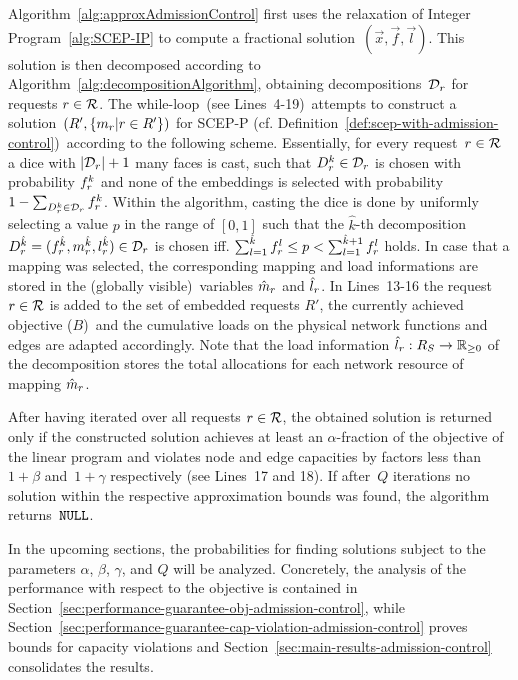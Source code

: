 \documentclass[10pt, conference, letterpaper]{IEEEtran}
\begin{document}
Algorithm~\ref{alg:approxAdmissionControl} first 
uses the relaxation of Integer Program~\ref{alg:SCEP-IP} to compute a 
fractional solution~$(\vec{x}, \vec{f}, \vec{l})$. This solution is then 
decomposed according to Algorithm~\ref{alg:decompositionAlgorithm}, obtaining decompositions~$\PotEmbeddings$ for requests $r \in \mathcal{R}$. 
The while-loop~(see Lines~4-19)~attempts to construct 
a solution~$(R', \{m_r | r \in R'\})$ for SCEP-P (cf. Definition~\ref{def:scep-with-admission-control})~according to the following scheme.
Essentially, for every request~$r \in \mathcal{R}$ a dice with $|\PotEmbeddings|+1$ many faces is cast, such that $D^k_{\req} \in \PotEmbeddings$ is chosen with probability $\prob$ and none of the embeddings is selected with probability $1-\sum_{D^k_{\req} \in \PotEmbeddings} \prob$. Within the algorithm, casting the dice is done by uniformly selecting a value $p$
 in the range of $[0,1]$ such that the $\hat{k}$-th
decomposition~$D^{\hat{k}}_{\req} = (\prob[\req][\hat{k}], \mapping[\req][{\hat{k}}],  \load[\req][{\hat{k}}]) \in  \PotEmbeddings$ is chosen iff. $\sum^{\hat{k}}_{l=1} \prob[\req][l] \leq p < \sum^{{\hat{k}}+1}_{l=1} \prob[\req][l] $ holds. In case that a mapping was selected, the corresponding mapping and load informations are stored in the (globally visible)~variables $\hat{m}_{r}$ and $\hat{l}_{r}$. In Lines~13-16 the request $r \in \mathcal{R}$ is added to the set of embedded requests $R'$, the currently achieved objective ($B$)~and the cumulative loads on the physical network functions and edges are adapted accordingly. Note that the load information $\hat{l}_{r}: R_{S} \to \mathbb{R}_{\geq 0}$ of the decomposition stores the total allocations for each network resource of mapping $\hat{m}_{r}$.


After having iterated over all requests $r \in \mathcal{R}$, the obtained solution is returned only if 
the constructed solution achieves at least an $\alpha$-fraction of the objective of the linear program and 
violates node and edge capacities by factors less than~$1+\beta$ and~$1+\gamma$ respectively 
(see Lines~17 and 18). If after~$Q$ iterations no solution within the respective approximation bounds was found, the algorithm returns~$\textnormal{\texttt{NULL}}$. 

In the upcoming sections, the probabilities for finding solutions subject to the parameters $\alpha$, $\beta$, $\gamma$, and $Q$ will be analyzed. Concretely, the analysis of the performance with respect to the objective is contained in Section~\ref{sec:performance-guarantee-obj-admission-control}, while Section~\ref{sec:performance-guarantee-cap-violation-admission-control} proves bounds for capacity violations and  Section~\ref{sec:main-results-admission-control} consolidates the results.
\end{document}

